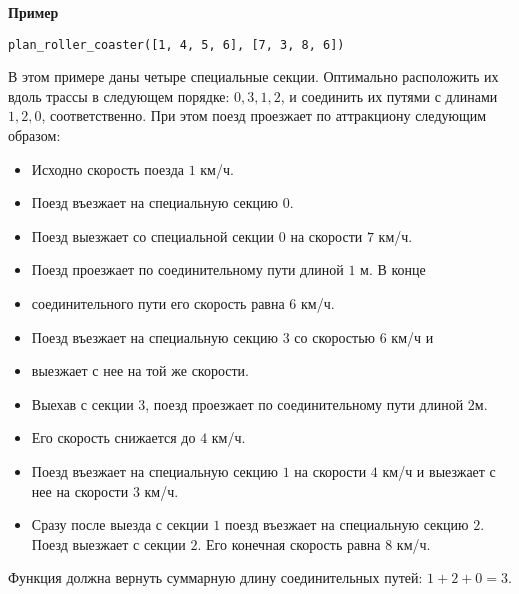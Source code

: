 \textbf{Пример}

\texttt{plan\_roller\_coaster([1, 4, 5, 6], [7, 3, 8, 6])}

В этом примере даны четыре специальные секции. Оптимально расположить их вдоль трассы в следующем порядке: $0, 3, 1, 2$, и соединить их путями с длинами $1, 2, 0$, соответственно. При этом поезд проезжает по аттракциону следующим образом:
\begin{itemize}
\item Исходно скорость поезда $1$ км/ч.
\item Поезд въезжает на специальную секцию $0$.
\item Поезд выезжает со специальной секции $0$ на скорости $7$ км/ч.
\item Поезд проезжает по соединительному пути длиной $1$ м. В конце
\item соединительного пути его скорость равна $6$ км/ч.
\item Поезд въезжает на специальную секцию $3$ со скоростью $6$ км/ч и
\item выезжает с нее на той же скорости.
\item Выехав с секции $3$, поезд проезжает по соединительному пути длиной $2$м.
\item Его скорость снижается до $4$ км/ч.
\item Поезд въезжает на специальную секцию $1$ на скорости $4$ км/ч и выезжает с нее на скорости $3$ км/ч.
\item Сразу после выезда с секции $1$ поезд въезжает на специальную секцию $2$. Поезд выезжает с секции $2$. Его конечная скорость равна $8$ км/ч.
\end{itemize}

Функция должна вернуть суммарную длину соединительных путей: $1 + 2 + 0 = 3$.